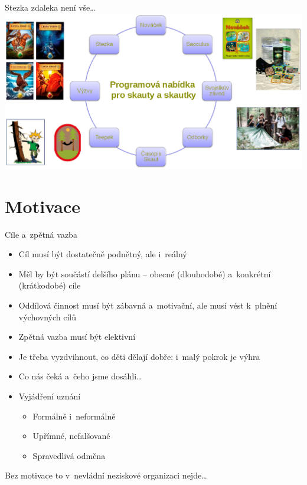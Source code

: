 \documentclass[compress,xelatex,xcolor=dvipsnames,print]{beamer}
\begin{document}
\begin{frame}{Stezka zdaleka není vše\ldots}
\includegraphics[width=\textwidth]{komplet.png}
\end{frame}

\section{Motivace}

\begin{frame}{Cíle a~zpětná vazba}
\begin{multicols}{2}
\begin{itemize}
\item Cíl musí být dostatečně podnětný, ale i~reálný
\item Měl by být součástí delšího plánu -- obecné (dlouhodobé) a~konkrétní (krátkodobé) cíle
\item Oddílová činnost musí být zábavná a~motivační, ale musí vést k~plnění výchovných cílů
\end{itemize}
\columnbreak
\begin{itemize}
\item Zpětná vazba musí být elektivní
\item Je třeba vyzdvihnout, co děti dělají dobře: i~malý pokrok je výhra
\item Co nás čeká a~čeho jsme dosáhli\ldots
\item Vyjádření uznání
 \begin{itemize}
 \item Formálně i~neformálně
 \item Upřímné, nefalšované
 \item Spravedlivá odměna
 \end{itemize}
\end{itemize}
\end{multicols}
Bez motivace to v~nevládní neziskové organizaci nejde\ldots
\end{frame}
\end{document}
